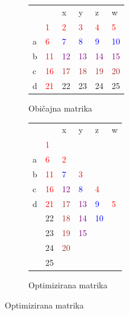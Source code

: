 \documentclass[a4paper,12pt,openright]{book}
\begin{document}
\begin{figure}[htb]

\begin{subfigure}{.5\textwidth}
\begin{center}
\begin{tabular}{|l|l|l|l|l|l|}
\cline{3-6}
  \multicolumn{2}{c|}{}  & x & y & z & w\\ \cline{2-6}
 \multicolumn{1}{c|}{} & \textcolor{red}{1} & \textcolor{red}{2} & \textcolor{red}{3} & \textcolor{red}{4} & \textcolor{red}{5}\\ \hline
a  & \textcolor{red}{6} & \textcolor{blue}{7} & \textcolor{blue}{8} & \textcolor{blue}{9} & \textcolor{blue}{10}\\ \hline
b  & \textcolor{red}{11} & \textcolor{purple}{12} & \textcolor{purple}{13} & \textcolor{purple}{14} & \textcolor{purple}{15}\\ \hline
c  & \textcolor{red}{16} & \textcolor{brown}{17} & \textcolor{brown}{18} & \textcolor{brown}{19} & \textcolor{brown}{20} \\ \hline
d  & \textcolor{red}{21} & 22 & 23 & 24 & 25 \\ \hline
\end{tabular}
\caption{Običajna matrika}
\label{normalMatrix}
\end{center}
\end{subfigure}%
\begin{subfigure}{.5\textwidth}
\begin{center}
\begin{tabular}{|l|l|l|l|l|l|}
\cline{3-6}
  \multicolumn{2}{c|}{}  & x & y & z & w\\ \cline{2-6}
 \multicolumn{1}{c|}{} & \textcolor{red}{1} & \multicolumn{4}{c}{} \\ \cline{1-3}
a  & \textcolor{red}{6} & \textcolor{red}{2} &  \multicolumn{3}{c}{} \\ \cline{1-4}
b  & \textcolor{red}{11} & \textcolor{blue}{7} & \textcolor{red}{3} & \multicolumn{2}{c}{}  \\ \cline{1-5}
c  & \textcolor{red}{16} & \textcolor{purple}{12} & \textcolor{blue}{8} & \textcolor{red}{4} & \multicolumn{1}{c}{} \\ \cline{1-6}
d  & \textcolor{red}{21} & \textcolor{brown}{17} & \textcolor{purple}{13} & \textcolor{blue}{9} & \textcolor{red}{5} \\ \hline
 \multicolumn{1}{c|}{} & 22 & \textcolor{brown}{18} & \textcolor{purple}{14} & \textcolor{blue}{10} & \multicolumn{1}{c}{}  \\ \cline{2-5}
\multicolumn{1}{c|}{}  & 23 & \textcolor{brown}{19} & \textcolor{purple}{15} & \multicolumn{2}{c}{}   \\ \cline{2-4}
\multicolumn{1}{c|}{}  & 24 & \textcolor{brown}{20} &  \multicolumn{3}{c}{}   \\ \cline{2-3}
\multicolumn{1}{c|}{}  & 25 & \multicolumn{4}{c}{}  \\ \cline{2-2}
\end{tabular}
\caption{Optimizirana matrika}
\label{diagonalMatrix}
\end{center}
\end{subfigure}%


\end{figure}
\end{document}
